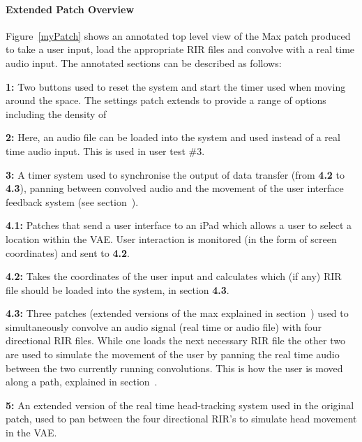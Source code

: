 \documentclass[../../main.tex]{subfiles}
\begin{document}
			\paragraph{Extended Patch Overview}
				Figure~\ref{myPatch} shows an annotated top level view of the Max patch produced to take a user input, load the appropriate \ac{RIR} files and convolve with a real time audio input. The annotated sections can be described as follows:

				\textbf{1:} Two buttons used to reset the system and start the timer used when moving around the space. The settings patch extends to provide a range of options including the density of 

				\textbf{2:} Here, an audio file can be loaded into the system and used instead of a real time audio input. This is used in user test \#3.

				\textbf{3:} A timer system used to synchronise the output of data transfer (from \textbf{4.2} to \textbf{4.3}), panning between convolved audio and the movement of the user interface feedback system (see section~).

				\textbf{4.1:} Patches that send a user interface to an iPad which allows a user to select a location within the \ac{VAE}. User interaction is monitored (in the form of screen coordinates) and sent to \textbf{4.2}.

				\textbf{4.2:} Takes the coordinates of the user input and calculates which (if any) \ac{RIR} file should be loaded into the system, in section \textbf{4.3}.

				\textbf{4.3:} Three patches (extended versions of the max explained in section~) used to simultaneously convolve an audio signal (real time or audio file) with four directional \ac{RIR} files. While one loads the next necessary \ac{RIR} file the other two are used to simulate the movement of the user by panning the real time audio between the two currently running convolutions. This is how the user is moved along a path, explained in section~.

				\textbf{5:} An extended version of the real time head-tracking system used in the original patch, used to pan between the four directional \ac{RIR}'s to simulate head movement in the \ac{VAE}.
\end{document}
